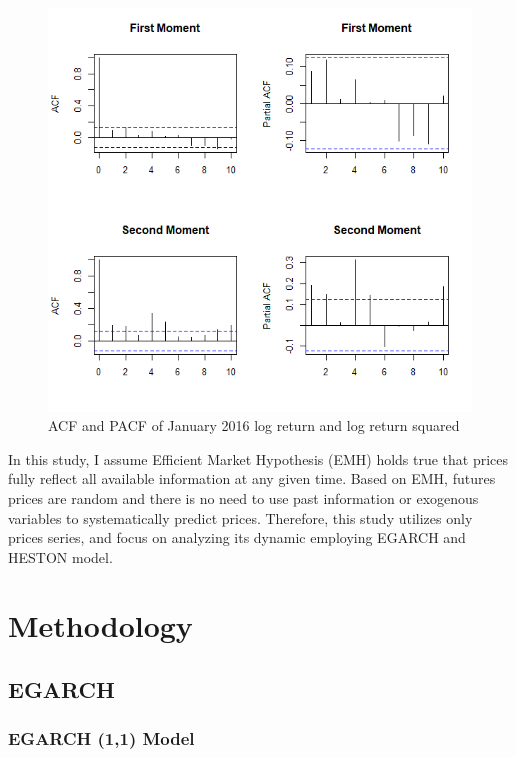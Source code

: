 \documentclass[12pt,a4paper]{article}
\numberwithin{equation}{section}
\begin{document}
\begin{figure}[h!] 
\includegraphics[scale=1,width=1\linewidth,height=0.4\textheight]{Jan16_pacf.png}
\caption{ACF and PACF of January 2016 log return and log return squared}
\label{Jan16pacf}
\end{figure}

In this study, I assume Efficient Market Hypothesis (EMH) holds true that prices fully reflect all available information at any given time. Based on EMH, futures prices are random and there is no need to use past information or exogenous variables to systematically predict prices. Therefore, this study utilizes only prices series, and focus on analyzing its dynamic employing EGARCH and HESTON model.

\section{Methodology}

\subsection{EGARCH}

\subsubsection{EGARCH (1,1) Model}
\end{document}
